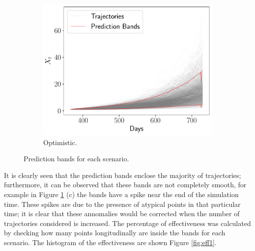 \documentclass[11pt]{article}
\theoremstyle{definition}
\theoremstyle{remark}
\theoremstyle{remark}
\begin{document}
\begin{figure}[t]
\begin{subfigure}[b]{0.45\textwidth}
      \includegraphics[scale=0.45]{bands_optimistic.pdf}
      \caption{Optimistic.}
  \end{subfigure}
  \caption{Prediction bands for each scenario.}
  \label{fig:pb1}
\end{figure}

It is clearly seen that the prediction bands enclose the majority of
trajectories; furthermore, it can be observed that these bands are not
completely smooth, for example in Figure \ref{fig:pb1} (c) the bands have a
spike near the end of the simulation time. These spikes are due to the presence
of atypical points in that particular time; it is clear that these annomalies
would be corrected when the number of trajectories considered is increased.
The percentage of effectiveness was calculated by checking how
many points longitudinally are inside the bands for each scenario. The
histogram of the effectiveness are shown Figure \ref{fig:eff1}.
\end{document}
